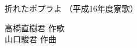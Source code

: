 \documentclass[10pt,b5j]{tarticle} %
\begin{document}
\begin{minipage}[c]{0.7\hsize} %
    \begin{center}
        {\LARGE
            折れたポプラよ %
        }
        {\small 
            （平成16年度寮歌） %
        }
    \end{center}
\end{minipage}
\begin{minipage}[c]{0.3\hsize} %
    \begin{flushright} %
        高橋直樹君 作歌\\山口駿君 作曲 %
    \end{flushright}
\end{minipage}
\end{document}
